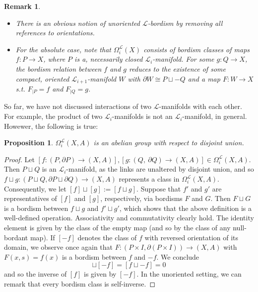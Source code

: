 \documentclass[11pt]{book}
\newtheorem{prop}{Proposition}
\newtheorem{remark}{Remark}
\begin{document}
\begin{remark}
\begin{itemize}
\item[1.] There is an obvious notion of unoriented $\mathcal{L}$-bordism by removing all references to orientations.
\item[2.] For the absolute case, note that $\Omega_i^{\mathcal{L}}(X)$ consists of bordism classes of maps $f: P \to X$, where $P$ is a, necessarily closed $\mathcal{L}_i$-manifold. For some $g: Q \to X$, the bordism relation between $f$ and $g$ reduces to the existence of some compact, oriented $\mathcal{L}_{i+1}$-manifold $W$ with $\partial W \cong P \sqcup -Q$ and a map $F: W \to X$ s.t. $F_{|P}=f$ and $F_{|Q}=g$.
\end{itemize}
\end{remark}

So far, we have not discussed interactions of two $\mathcal{L}$-manifolds with each other. For example, the product of two $\mathcal{L}_i$-manifolds is not an $\mathcal{L}_i$-manifold, in general. Howewer, the following is true:

\begin{prop}
$\Omega_i^{\mathcal{L}}(X,A)$ is an abelian group with respect to disjoint union.
\end{prop}

\begin{proof}
Let $[f: (P, \partial P) \to (X,A)], [g: (Q,\ \partial Q) \to (X,A)] \in \Omega_i^{\mathcal{L}}(X,A)$. Then $P \sqcup Q$ is an $\mathcal{L}_i$-manifold, as the links are unaltered by disjoint union, and so $f \sqcup g: (P \sqcup Q, \partial P \sqcup \partial Q) \to (X,A)$ represents a class in $\Omega_i^{\mathcal{L}}(X,A)$. Consequently, we let $[f] \sqcup [g]:= [f \sqcup g]$. Suppose that $f'$ and $g'$ are representatives of $[f]$ and $[g]$, respectively, via bordisms $F$ and $G$. Then $F \sqcup G$ is a bordism between $f \sqcup g$ and $f' \sqcup g'$, which shows that the above definition is a well-defined operation. Associativity and commutativity clearly hold. The identity element is given by the class of the empty map (and so by the class of any null-bordant map). If $[-f]$ denotes the class of $f$ with reversed orientation of its domain, we observe once again that $F: (P \times I, \partial(P \times I)) \to (X,A)$ with $F(x,s)=f(x)$ is a bordism between $f$ and $-f$. We conclude
\begin{equation*}
[f] \sqcup [-f] = [f \sqcup -f] = 0 
\end{equation*}
and so the inverse of $[f]$ is given by $[-f]$. In the unoriented setting, we can remark that every bordism class is self-inverse.
\end{proof}
\end{document}
